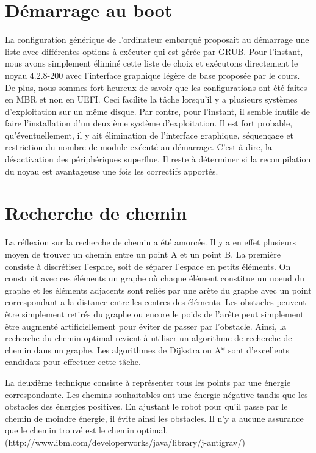 \section{Démarrage au boot}
La configuration générique de l'ordinateur embarqué proposait au démarrage une liste avec différentes options à exécuter qui est gérée par GRUB. Pour l'instant, nous avons simplement éliminé
cette liste de choix et exécutons directement le noyau 4.2.8-200 avec l'interface graphique légère de base proposée par le cours. De plus, nous sommes fort heureux de savoir que les configurations
ont été faites en MBR et non en UEFI. Ceci facilite la tâche lorsqu'il y a plusieurs systèmes d'exploitation sur un même disque. Par contre, pour l'instant, il semble inutile de faire l'installation
d'un deuxième système d'exploitation. Il est fort probable, qu'éventuellement, il y ait élimination de l'interface graphique, séquençage et restriction du nombre de module exécuté au démarrage.
C'est-à-dire, la désactivation des périphériques superflue. Il reste à déterminer si la recompilation du noyau est avantageuse une fois les correctifs apportés.


\section{Recherche de chemin}
La réflexion sur la recherche de chemin a été amorcée. Il y a en effet plusieurs moyen de trouver un chemin entre un point A et un point B.
La première consiste à discrétiser l'espace, soit de séparer l'espace en
petits éléments.  On construit avec ces éléments un graphe où chaque élément
constitue un noeud du graphe et les éléments adjacents sont reliés par une arète
du graphe avec un point correspondant a la distance entre les centres des
éléments.  Les obstacles peuvent être simplement retirés du graphe ou encore le
poids de l'arête peut simplement être augmenté artificiellement pour éviter de passer par
l'obstacle.  Ainsi, la recherche du chemin optimal revient à utiliser un
algorithme de recherche de chemin dans un graphe.  Les algorithmes de Dijkstra
ou A* sont d'excellents candidats pour effectuer cette tâche.

La deuxième technique consiste à représenter tous les points par une énergie
correspondante.  Les chemins souhaitables ont une énergie négative tandis que
les obstacles des énergies positives.  En ajustant le robot pour qu'il passe par
le chemin de moindre énergie, il évite ainsi les obstacles.  Il n'y a aucune
assurance que le chemin trouvé est le chemin optimal.
(http://www.ibm.com/developerworks/java/library/j-antigrav/)

